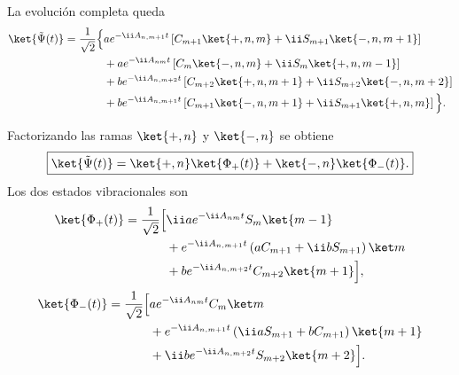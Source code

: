 La evoluci\'on completa queda
\begin{equation}
\begin{aligned}
  \ket{\tilde\Psi(t)}
  =\frac{1}{\sqrt2}\Big\{&
  a e^{-\ii A_{n,m+1}t}
  \left[
  C_{m+1}\ket{+,n,m}
  +\ii S_{m+1}\ket{-,n,m+1}
  \right]
  \\
  &+
  a e^{-\ii A_{nm}t}
  \left[
  C_m\ket{-,n,m}
  +\ii S_m\ket{+,n,m-1}
  \right]
  \\
  &+
  b e^{-\ii A_{n,m+2}t}
  \left[
  C_{m+2}\ket{+,n,m+1}
  +\ii S_{m+2}\ket{-,n,m+2}
  \right]
  \\
  &+
  b e^{-\ii A_{n,m+1}t}
  \left[
  C_{m+1}\ket{-,n,m+1}
  +\ii S_{m+1}\ket{+,n,m}
  \right]
  \Big\}.
\end{aligned}
\end{equation}

Factorizando las ramas $\ket{+,n}$ y $\ket{-,n}$ se obtiene
\begin{equation}
  \boxed{
  \ket{\tilde\Psi(t)}
  =
  \ket{+,n}\ket{\Phi_+(t)}
  +
  \ket{-,n}\ket{\Phi_-(t)}.
  }
\end{equation}
Los dos estados vibracionales son
\begin{equation}
\begin{aligned}
  \ket{\Phi_+(t)}
  =\frac{1}{\sqrt2}\Big[&
  \ii a e^{-\ii A_{nm}t}S_m\ket{m-1}
  \\
  &+
  e^{-\ii A_{n,m+1}t}
  \left(aC_{m+1}+\ii bS_{m+1}\right)\ket m
  \\
  &+
  b e^{-\ii A_{n,m+2}t}C_{m+2}\ket{m+1}
  \Big],
\end{aligned}
\end{equation}
\begin{equation}
\begin{aligned}
  \ket{\Phi_-(t)}
  =\frac{1}{\sqrt2}\Big[&
  a e^{-\ii A_{nm}t}C_m\ket m
  \\
  &+
  e^{-\ii A_{n,m+1}t}
  \left(\ii aS_{m+1}+bC_{m+1}\right)\ket{m+1}
  \\
  &+
  \ii b e^{-\ii A_{n,m+2}t}S_{m+2}\ket{m+2}
  \Big].
\end{aligned}
\end{equation}


